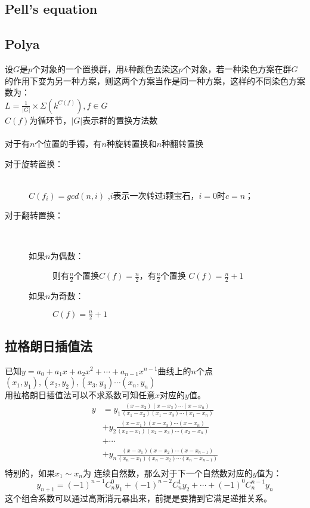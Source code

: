 \subsection{Pell's equation}


\subsection{Polya}
	设$G$是$p$个对象的一个置换群，用$k$种颜色去染这$p$个对象，若一种染色方案在群$G$的作用下变为另一种方案，则这两个方案当作是同一种方案，这样的不同染色方案数为：\\
	$L=\frac{1}{\left |G  \right |}\times \Sigma(k^{C(f)}), f\in G$\\
	$C(f)$为循环节，$\left |G  \right |$表示群的置换方法数\\
	\\
	对于有$n$个位置的手镯，有$n$种旋转置换和$n$种翻转置换
	\begin{description}
		\item[对于旋转置换：] ~\\
		$C(f_i)=gcd(n,i)$ ,$i$表示一次转过i颗宝石，$i=0$时$c=n$；\\
		\item[对于翻转置换：] ~\\
		\begin{description}
			\item[如果$n$为偶数：] 则有$\frac{n}{2}$个置换$C(f)=\frac{n}{2}$，有$\frac{n}{2}$个置换 $C(f)=\frac{n}{2}+1$\\
			\item[如果$n$为奇数：] $C(f)=\frac{n}{2}+1$\\
		\end{description}
	\end{description}

	\subsection{拉格朗日插值法}
	已知$y=a_0+a_1x+a_2x^2+\cdots +a_{n-1}x^{n-1}$曲线上的$n$个点$(x_1,y_1),(x_2,y_2),(x_3,y_3)\cdots (x_n,y_n)$\\
	用拉格朗日插值法可以不求系数可知任意$x$对应的$y$值。\\
	\[ \begin{split}
	y &= y_1\frac{(x-x_2)(x-x_3)\cdots (x-x_n)}{(x_1-x_2)(x_1-x_3)\cdots (x_1-x_n)}\\
	&+ y_2\frac{(x-x_1)(x-x_3)\cdots (x-x_n)}{(x_2-x_1)(x_2-x_3)\cdots (x_2-x_n)}\\
	&+ \cdots \\
	&+ y_n\frac{(x-x_1)(x-x_2)\cdots (x-x_{n-1})}{(x_n-x_1)(x_n-x_2)\cdots (x_n-x_{n-1})}\\
	\end{split}\]
	特别的，如果$x_1\sim x_n$为 连续自然数，那么对于下一个自然数对应的$y$值为：\\
	\[y_{n+1}=(-1)^{n-1}C_n^0y_1+(-1)^{n-2}C_n^1y_2+\cdots +(-1)^0C_n^{n-1}y_n\]
	这个组合系数可以通过高斯消元暴出来，前提是要猜到它满足递推关系。\\
	
